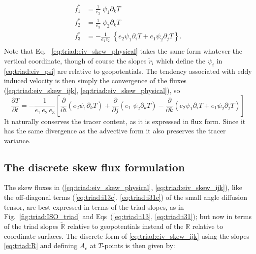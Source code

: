 \documentclass[NEMO_book]{subfiles}
\begin{document}
\begin{equation}\label{eq:triad:eiv_skew_physical}
\begin{split}
 f^*_1 & = \frac{1}{e_{3}}\; \psi_1 \partial_k T   \\
 f^*_2 & = \frac{1}{e_{3}}\; \psi_2 \partial_k T   \\
 f^*_3 & =  -\frac{1}{e_{1}e_{2}}\; \left\{ e_{2} \psi_1 \partial_i T
   + e_{1} \psi_2 \partial_j T \right\}. \\
\end{split}
\end{equation}
Note that Eq.~ \eqref{eq:triad:eiv_skew_physical} takes the same form whatever the
vertical coordinate, though of course the slopes
$\tilde{r}_i$ which define the $\psi_i$ in \eqref{eq:triad:eiv_psi} are relative to geopotentials.
The tendency associated with eddy induced velocity is then simply the convergence
of the fluxes (\ref{eq:triad:eiv_skew_ijk}, \ref{eq:triad:eiv_skew_physical}), so
\begin{equation} \label{eq:triad:skew_eiv_conv}
\frac{\partial T}{\partial t}= -\frac{1}{e_1 \, e_2 \, e_3 }      \left[
  \frac{\partial}{\partial i} \left( e_2 \psi_1 \partial_k T\right)
  + \frac{\partial}{\partial j} \left( e_1  \;
    \psi_2 \partial_k T\right)
 -  \frac{\partial}{\partial k} \left( e_{2} \psi_1 \partial_i T
   + e_{1} \psi_2 \partial_j T \right)  \right]
\end{equation}
 It naturally conserves the tracer content, as it is expressed in flux
 form. Since it has the same divergence as the advective form it also
 preserves the tracer variance.

\subsection{The discrete skew flux formulation}
The skew fluxes in (\ref{eq:triad:eiv_skew_physical}, \ref{eq:triad:eiv_skew_ijk}), like the off-diagonal terms
(\ref{eq:triad:i13c}, \ref{eq:triad:i31c}) of the small angle diffusion tensor, are best
expressed in terms of the triad slopes, as in Fig.~\ref{fig:triad:ISO_triad}
and Eqs~(\ref{eq:triad:i13}, \ref{eq:triad:i31}); but now in terms of the triad slopes
$\tilde{\mathbb{R}}$ relative to geopotentials instead of the
$\mathbb{R}$ relative to coordinate surfaces. The discrete form of
\eqref{eq:triad:eiv_skew_ijk} using the slopes \eqref{eq:triad:R} and
defining $A_e$ at $T$-points is then given by:
\end{document}
